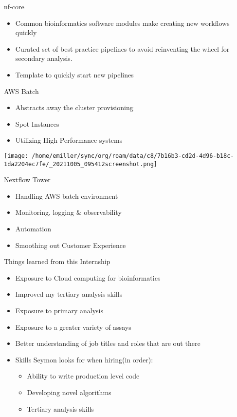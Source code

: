 \documentclass[bigger]{beamer}
\begin{document}
\begin{frame}[label={sec:orgd7ba3b8}]{nf-core}
\begin{itemize}
\item Common bioinformatics software modules make creating new workflows quickly

\item Curated set of best practice pipelines to avoid reinventing the wheel for
\alert{secondary analysis}.

\item Template to quickly start new pipelines
\end{itemize}
\end{frame}

\begin{frame}[label={sec:orgcf41bad}]{AWS Batch}
\begin{itemize}
\item Abstracts away the cluster provisioning
\item Spot Instances
\item Utilizing High Performance systems
\end{itemize}


\begin{center}
\texttt{[image: /home/emiller/sync/org/roam/data/c8/7b16b3-cd2d-4d96-b18c-1da2204ec7fe/\_20211005\_095412screenshot.png]}
\end{center}
\end{frame}

\begin{frame}[label={sec:org463cb94}]{Nextflow Tower}
\begin{itemize}
\item Handling AWS batch environment
\item Monitoring, logging \& observability
\item Automation
\item Smoothing out Customer Experience
\end{itemize}
\end{frame}

\begin{frame}[label={sec:orgcf62980}]{Things learned from this Internship}
\begin{itemize}
\item Exposure to Cloud computing for bioinformatics
\item Improved my tertiary analysis skills
\item Exposure to primary analysis
\item Exposure to a greater variety of assays
\item Better understanding of job titles and roles that are out there
\item Skills Seymon looks for when hiring(in order):
\begin{itemize}
\item Ability to write production level code
\item Developing novel algorithms
\item Tertiary analysis skills
\end{itemize}
\end{itemize}
\end{frame}
\end{document}
